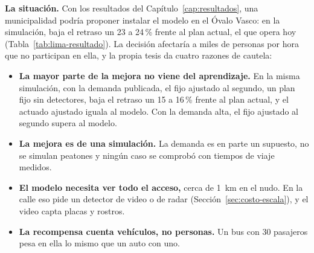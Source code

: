 \noindent\textbf{La situación.} Con los resultados del
Capítulo~\ref{cap:resultados}, una municipalidad podría proponer
instalar el modelo en el Óvalo Vasco: en la simulación, baja el retraso
un 23 a 24\,\% frente al plan actual, el que opera hoy
(Tabla~\ref{tab:lima-resultado}). La decisión afectaría a miles de
personas por hora que no participan en ella, y la propia tesis da cuatro
razones de cautela:
\begin{itemize}
  \item \textbf{La mayor parte de la mejora no viene del aprendizaje.}
    En la misma simulación, con la demanda publicada, el fijo ajustado
    al segundo, un plan fijo sin detectores, baja el retraso un 15 a
    16\,\% frente al plan actual, y el actuado ajustado iguala al modelo.
    Con la demanda alta, el fijo ajustado al segundo supera al modelo.
  \item \textbf{La mejora es de una simulación.} La demanda es en parte
    un supuesto, no se simulan peatones y ningún caso se comprobó con
    tiempos de viaje medidos.
  \item \textbf{El modelo necesita ver todo el acceso,} cerca de 1~km en
    el nudo. En la calle eso pide un detector de video o de radar
    (Sección~\ref{sec:costo-escala}), y el video capta placas y rostros.
  \item \textbf{La recompensa cuenta vehículos, no personas.} Un bus con
    30 pasajeros pesa en ella lo mismo que un auto con uno.
\end{itemize}

